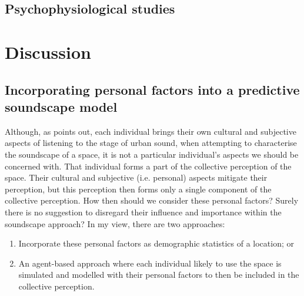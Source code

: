
\subsection{Psychophysiological studies}




\section{Discussion}
 \subsection{Incorporating personal factors into a predictive soundscape model}
Although, as \citet{Droumeva2021sound} points out, each individual brings their own cultural and subjective aspects of listening to the stage of urban sound, when attempting to characterise the soundscape of a space, it is not a particular individual's aspects we should be concerned with. That individual forms a part of the collective perception of the space. Their cultural and subjective (i.e. personal) aspects mitigate their perception, but this perception then forms only a single component of the collective perception. How then should we consider these personal factors? Surely there is no suggestion to disregard their influence and importance within the soundscape approach? In my view, there are two approaches:

\begin{enumerate}
  \item Incorporate these personal factors as demographic statistics of a location; or
  \item An agent-based approach where each individual likely to use the space is simulated and modelled with their personal factors to then be included in the collective perception.
\end{enumerate}

